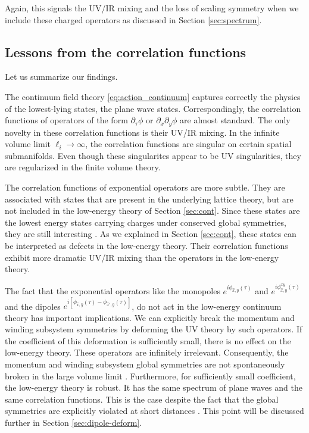 \documentclass[12pt]{article}
\numberwithin{equation}{section}
\begin{document}
Again, this signals the UV/IR mixing and the loss of scaling symmetry when we include these charged operators as discussed in Section  \ref{sec:spectrum}.


\subsection{Lessons from the correlation functions}

Let us summarize our findings.

The continuum field theory \eqref{eq:action_continuum} captures correctly the physics of the lowest-lying states, the plane wave states.  Correspondingly, the correlation functions of operators of the form $\partial_\tau \phi$ or $\partial_x \partial_y\phi$ are almost standard.  The only novelty in these correlation functions is their UV/IR mixing.  In the infinite volume limit $\ell_i\to \infty$, the correlation functions are singular on certain spatial submanifolds.  Even though these singularites appear to be UV singularities, they are regularized in the finite volume theory.

The correlation functions of exponential operators are more subtle.  They are associated with states that are present in the underlying lattice theory, but are not included in the low-energy theory of Section \ref{sec:cont}.  Since these states are the lowest energy states carrying charges under conserved global symmetries, they are still interesting \cite{paper1}.  As we explained in Section \ref{sec:cont}, these states can be interpreted as defects in the low-energy theory.  Their correlation functions exhibit more dramatic UV/IR mixing than the operators in the low-energy theory.

The fact that the exponential operators like the monopoles $e^{i\phi_{\hat x,\hat y}(\tau)}$ and $e^{i\phi^{xy}_{\hat x,\hat y}(\tau)}$ and the dipoles $e^{i[\phi_{\hat x,\hat y}(\tau)-\phi_{\hat x',\hat y}(\tau)]}$, do not act in the low-energy continuum theory  has important implications.  We can explicitly break the momentum and winding subsystem symmetries by deforming the UV theory by such operators.  If the coefficient of this deformation is sufficiently small, there is no effect on the low-energy theory.  These operators are infinitely irrelevant.  Consequently, the momentum and winding subsystem global symmetries are not spontaneously broken in the large volume limit \cite{PhysRevB.72.045137,You:2019cvs,paper1}.  Furthermore, for sufficiently small coefficient, the low-energy theory is robust.  It has the same spectrum of plane waves and the same correlation functions.  This is the case despite the fact that the global symmetries are explicitly violated at short distances \cite{paper1}.  This point will be discussed further in Section \ref{sec:dipole-deform}.
\end{document}
